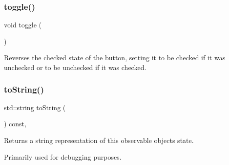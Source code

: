 \subsubsection{\texorpdfstring{toggle()}{toggle()}}
{\footnotesize\ttfamily void toggle (\begin{DoxyParamCaption}{ }\end{DoxyParamCaption})\hspace{0.3cm}{\ttfamily [virtual]}}



Reverses the checked state of the button, setting it to be checked if it was unchecked or to be unchecked if it was checked. 

\mbox{\label{classsgl_1_1GObservable_a1fe5121d6528fdea3f243321b3fa3a49}} 
\subsubsection{\texorpdfstring{to\+String()}{toString()}}
{\footnotesize\ttfamily std\+::string to\+String (\begin{DoxyParamCaption}{ }\end{DoxyParamCaption}) const\hspace{0.3cm}{\ttfamily [virtual]}, {\ttfamily [inherited]}}



Returns a string representation of this observable object\textquotesingle{}s state. 

Primarily used for debugging purposes. 